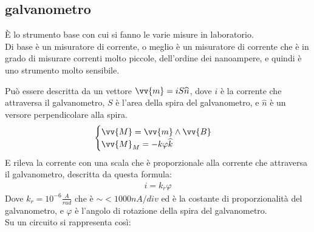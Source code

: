 \documentclass[a4paper, oneside]{article}
\begin{document}
\subsection{galvanometro}
È lo strumento base con cui si fanno le varie misure in laboratorio.\\
Di base è un misuratore di corrente, o meglio è un misuratore di corrente che è in grado di misurare correnti molto piccole, dell'ordine dei nanoampere, e quindi è uno strumento molto sensibile.\\ 
\begin{center}
\end{center}
Può essere descritta da un vettore $\vv{m} = i S \widehat{n}$, dove $i$ è la corrente che attraversa il galvanometro, $S$ è l'area della spira del galvanometro, e $\widehat{n}$ è un versore perpendicolare alla spira.\\
\begin{gather*}
\begin{cases}
        \vv{M} = \vv{m} \land \vv{B}\\
        \vv{M}_M = -k \varphi \widehat{k}
\end{cases}
\end{gather*}
E rileva la corrente con una scala che è proporzionale alla corrente che attraversa il galvanometro, descritta da questa formula:
\begin{gather*}
    i = k_r \varphi
\end{gather*}
Dove $k_r = 10^{-6} \frac{A}{rad}$ che è $\sim < 1000 n A/div$ ed è la costante di proporzionalità del galvanometro, e $\varphi$ è l'angolo di rotazione della spira del galvanometro.\\
Su un circuito si rappresenta così:
\begin{center}
\end{center}
\end{document}
